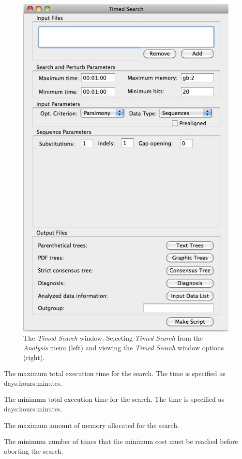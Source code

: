 {\begin{figure}
\begin{minipage}[c]{0.52\textwidth}
	   	\includegraphics[width=\textwidth]{doc/figures/timedsearch_window.jpg}
   	\end{minipage}
	
\caption{The \emph{Timed Search} window. Selecting \emph{Timed Search} from the \emph{Analysis} menu (left) and viewing the \emph{Timed Search} window options (right).}
\label{fig:timed_search}
\end{figure}

\begin{description}
\setlength{\labelsep}{5pt}
\setlength{\itemindent}{0pt}%
    \item[Maximum time] The maximum total execution time for the search. The time is specified as
        days:hours:minutes.
    \item[Minimum time] The minimum total execution time for the search. The time is specified as
        days:hours:minutes.
    \item[Maximum memory] The maximum amount of memory allocated for the search.
    \item[Minimum hits] The minimum number of times that the minimum cost must be reached before aborting the search.
\end{description}

}
